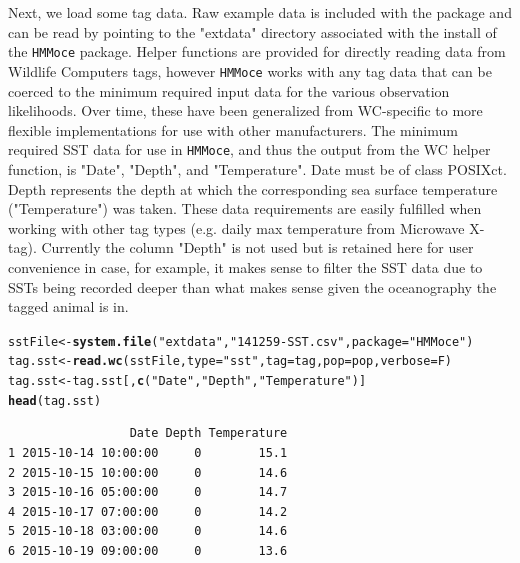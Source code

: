 \documentclass{article}\usepackage[]{graphicx}\usepackage[]{color}
\makeatletter
\newcommand{\hlstr}[1]{\textcolor[rgb]{0.192,0.494,0.8}{#1}}%
\newcommand{\hlstd}[1]{\textcolor[rgb]{0.345,0.345,0.345}{#1}}%
\newcommand{\hlkwb}[1]{\textcolor[rgb]{0.69,0.353,0.396}{#1}}%
\newcommand{\hlkwc}[1]{\textcolor[rgb]{0.333,0.667,0.333}{#1}}%
\newcommand{\hlkwd}[1]{\textcolor[rgb]{0.737,0.353,0.396}{\textbf{#1}}}%
\newenvironment{kframe}{%
 \def\at@end@of@kframe{}%
 \ifinner\ifhmode%
  \def\at@end@of@kframe{\end{minipage}}%
  \begin{minipage}{\columnwidth}%
 \fi\fi%
 \def\FrameCommand##1{\hskip\@totalleftmargin \hskip-\fboxsep
 \colorbox{shadecolor}{##1}\hskip-\fboxsep
     \hskip-\linewidth \hskip-\@totalleftmargin \hskip\columnwidth}%
 \MakeFramed {\advance\hsize-\width
   \@totalleftmargin\z@ \linewidth\hsize
   \@setminipage}}%
 {\par\unskip\endMakeFramed%
 \at@end@of@kframe}
\newenvironment{knitrout}{}{} %
\makeatother
\begin{document}
Next, we load some tag data. Raw example data is included with the package and can be read by pointing to the "extdata" directory associated with the install of the \texttt{HMMoce} package. Helper functions are provided for directly reading data from Wildlife Computers tags, however \texttt{HMMoce} works with any tag data that can be coerced to the minimum required input data for the various observation likelihoods. Over time, these have been generalized from WC-specific to more flexible implementations for use with other manufacturers. The minimum required SST data for use in \texttt{HMMoce}, and thus the output from the WC helper function, is "Date", "Depth", and "Temperature". Date must be of class POSIXct. Depth represents the depth at which the corresponding sea surface temperature ("Temperature") was taken. These data requirements are easily fulfilled when working with other tag types (e.g. daily max temperature from Microwave X-tag). Currently the column "Depth" is not used but is retained here for user convenience in case, for example, it makes sense to filter the SST data due to SSTs being recorded deeper than what makes sense given the oceanography the tagged animal is in. 

\begin{knitrout}\small
{}\color{fgcolor}\begin{kframe}
\begin{alltt}
\hlstd{sstFile} \hlkwb{<-} \hlkwd{system.file}\hlstd{(}\hlstr{"extdata"}\hlstd{,} \hlstr{"141259-SST.csv"}\hlstd{,} \hlkwc{package} \hlstd{=} \hlstr{"HMMoce"}\hlstd{)}
\hlstd{tag.sst} \hlkwb{<-} \hlkwd{read.wc}\hlstd{(sstFile,} \hlkwc{type} \hlstd{=} \hlstr{"sst"}\hlstd{,} \hlkwc{tag} \hlstd{= tag,} \hlkwc{pop} \hlstd{= pop,} \hlkwc{verbose} \hlstd{= F)}
\hlstd{tag.sst} \hlkwb{<-} \hlstd{tag.sst[,} \hlkwd{c}\hlstd{(}\hlstr{"Date"}\hlstd{,} \hlstr{"Depth"}\hlstd{,} \hlstr{"Temperature"}\hlstd{)]}
\hlkwd{head}\hlstd{(tag.sst)}
\end{alltt}
\begin{verbatim}
                 Date Depth Temperature
1 2015-10-14 10:00:00     0        15.1
2 2015-10-15 10:00:00     0        14.6
3 2015-10-16 05:00:00     0        14.7
4 2015-10-17 07:00:00     0        14.2
5 2015-10-18 03:00:00     0        14.6
6 2015-10-19 09:00:00     0        13.6
\end{verbatim}
\end{kframe}
\end{knitrout}
\end{document}
